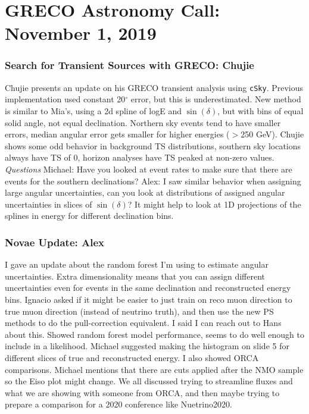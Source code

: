 \chapter{GRECO Astronomy Call: November 1, 2019}

\subsection{Search for Transient Sources with GRECO: Chujie}
Chujie presents an update on his GRECO transient analysis using \texttt{cSky}. Previous implementation used constant 20$^{\circ}$ error, but this is underestimated. New method is similar to Mia's, using a 2d spline of logE and $\sin(\delta)$, but with bins of equal solid angle, not equal declination. Northern sky events tend to have smaller errors, median angular error gets smaller for higher energies ($>$250 GeV). Chujie shows some odd behavior in background TS distributions, southern sky locations always have TS of 0, horizon analyses have TS peaked at non-zero values. 
\textit{Questions} Michael: Have you looked at event rates to make sure that there are events for the southern declinations? Alex: I saw similar behavior when assigning large angular uncertainties, can you look at distributions of assigned angular uncertainties in slices of $\sin(\delta)$? It might help to look at 1D projections of the splines in energy for different declination bins. 

\subsection{Novae Update: Alex}
I gave an update about the random forest I'm using to estimate angular uncertainties. Extra dimensionality means that you can assign different uncertainties even for events in the same declination and reconstructed energy bins. Ignacio asked if it might be easier to just train on reco muon direction to true muon direction (instead of neutrino truth), and then use the new PS methods to do the pull-correction equivalent. I said I can reach out to Hans about this. Showed random forest model performance, seems to do well enough to include in a likelihood. Michael suggested making the histogram on slide 5 for different slices of true and reconstructed energy. I also showed ORCA comparisons. Michael mentions that there are cuts applied after the NMO sample so the Eiso plot might change. We all discussed trying to streamline fluxes and what we are showing with someone from ORCA, and then maybe trying to prepare a comparison for a 2020 conference like Nuetrino2020.

